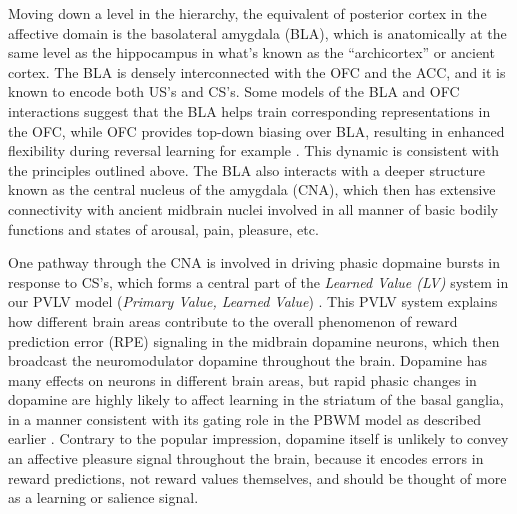 \documentclass[11pt,twoside]{article}
\begin{document}
Moving down a level in the hierarchy, the equivalent of posterior cortex in the affective domain is the basolateral amygdala (BLA), which is anatomically at the same level as the hippocampus in what's known as the ``archicortex'' or ancient cortex.  The BLA is densely interconnected with the OFC and the ACC, and it is known to encode both US's and CS's.  Some models of the BLA and OFC interactions suggest that the BLA helps train corresponding representations in the OFC, while OFC provides top-down biasing over BLA, resulting in enhanced flexibility during reversal learning for example \cite{FrankClaus06,PauliEtAl12}.  This dynamic is consistent with the principles outlined above.  The BLA also interacts with a deeper structure known as the central nucleus of the amygdala (CNA), which then has extensive connectivity with ancient midbrain nuclei involved in all manner of basic bodily functions and states of arousal, pain, pleasure, etc.

One pathway through the CNA is involved in driving phasic dopmaine bursts in response to CS's, which forms a central part of the {\em Learned Value (LV)} system in our PVLV model ({\em Primary Value, Learned Value}) \cite{OReillyEtAl08,HazyEtAl10}.  This PVLV system explains how different brain areas contribute to the overall phenomenon of reward prediction error (RPE) signaling in the midbrain dopamine neurons, which then broadcast the neuromodulator dopamine throughout the brain.  Dopamine has many effects on neurons in different brain areas, but rapid phasic changes in dopamine are highly likely to affect learning in the striatum of the basal ganglia, in a manner consistent with its gating role in the PBWM model as described earlier \cite{Frank05}.  Contrary to the popular impression, dopamine itself is unlikely to convey an affective pleasure signal throughout the brain, because it encodes errors in reward predictions, not reward values themselves, and should be thought of more as a learning or salience signal.
\end{document}

